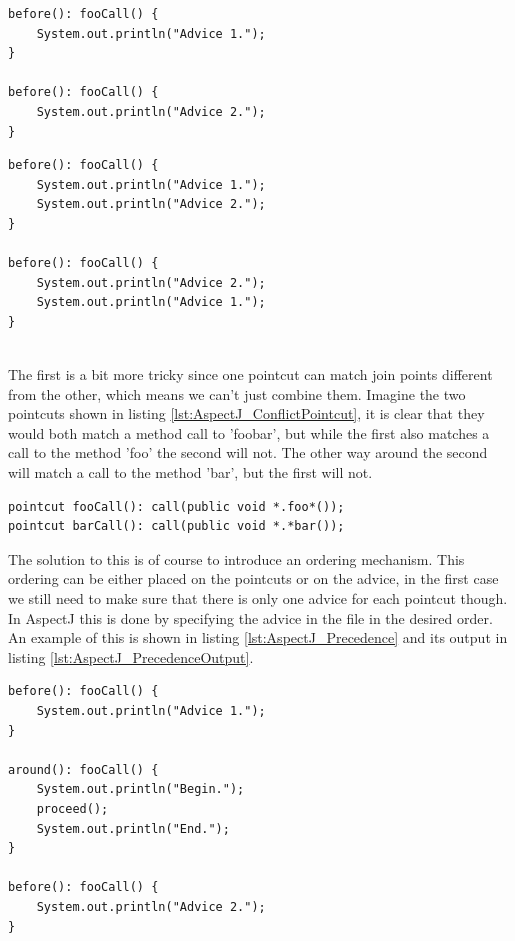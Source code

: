 \documentclass[a4paper]{report}
\begin{document}
\begin{minipage}{0.48\textwidth}
\begin{lstlisting}[caption=Two colliding advice.,label=lst:MergeAdviceBefore]
before(): fooCall() {
	System.out.println("Advice 1.");
}

before(): fooCall() {
	System.out.println("Advice 2.");
}
\end{lstlisting}
\end{minipage}\hfill
\begin{minipage}{0.48\textwidth}
\begin{lstlisting}[caption=Two possible merged versions of the advice.,label=lst:MergeAdviceAfter]
before(): fooCall() {
	System.out.println("Advice 1.");
	System.out.println("Advice 2.");
}

before(): fooCall() {
	System.out.println("Advice 2.");
	System.out.println("Advice 1.");
}
\end{lstlisting}
\end{minipage}\\
The first is a bit more tricky since one pointcut can match join points different from the other, which means we can't just combine them. Imagine the two pointcuts shown in listing \ref{lst:AspectJ_ConflictPointcut}, it is clear that they would both match a method call to 'foobar', but while the first also matches a call to the method 'foo' the second will not. The other way around the second will match a call to the method 'bar', but the first will not.
\begin{lstlisting}[caption=Overlapping pointcuts.,label=lst:AspectJ_ConflictPointcut]
pointcut fooCall(): call(public void *.foo*());
pointcut barCall(): call(public void *.*bar());
\end{lstlisting}
The solution to this is of course to introduce an ordering mechanism. This ordering can be either placed on the pointcuts or on the advice, in the first case we still need to make sure that there is only one advice for each pointcut though. In AspectJ this is done by specifying the advice in the file in the desired order. An example of this is shown in listing \ref{lst:AspectJ_Precedence} and its output in listing \ref{lst:AspectJ_PrecedenceOutput}.\\
\begin{minipage}{0.48\textwidth}
\begin{lstlisting}[caption=Example of declaring precedence.,label=lst:AspectJ_Precedence]
before(): fooCall() {
	System.out.println("Advice 1.");
}

around(): fooCall() {
	System.out.println("Begin.");
	proceed();
	System.out.println("End.");
}

before(): fooCall() {
	System.out.println("Advice 2.");
}
\end{lstlisting}
\end{minipage}\hfill
\end{document}
